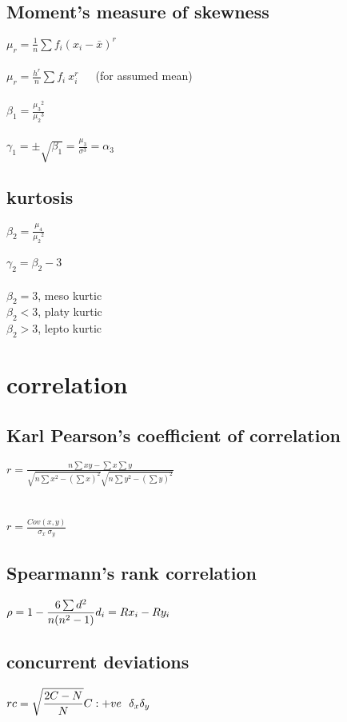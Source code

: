\documentclass[12pt]{article}
\begin{document}
\subsection{Moment's measure of skewness}
$\displaystyle \mu_r = \frac{1}{n} \sum{f_i(x_i -  \bar{x})^r}$ \\ \\
$\displaystyle \mu_r = \frac{h^r}{n} \sum{f_i\ x_i^r}$\ \ \ (for assumed mean) \\ \\
$\displaystyle \beta_1 = \frac{{\mu_3}^2}{{\mu_2}^3}$ \\ \\
$\displaystyle \gamma_1 = \pm \sqrt{\beta_1} = \frac{\mu_3}{\sigma^3} = \alpha_3$
\newpage

\subsection{kurtosis}
$\displaystyle \beta_2 = \frac{\mu_4}{{\mu_2}^2}$ \\ \\
$\displaystyle \gamma_2 = \beta_2 - 3$ \\ \\
$\beta_2 = 3$, meso kurtic \\
$\beta_2 < 3$, platy kurtic \\
$\beta_2 > 3$, lepto kurtic

\section{correlation}
\subsection{Karl Pearson's coefficient of correlation}
$\displaystyle r = \frac{ n \sum{xy} - \sum{x}\sum{y} }{
\sqrt{n\sum{x^2} - {(\sum{x})}^2 } \sqrt{n\sum{y^2} - {(\sum{y})}^2 } }$ \\ \\ \\
$\displaystyle r = \frac{Cov(x, y)}{\sigma_x\ \sigma_y}$

\subsection{Spearmann's rank correlation}
$\displaystyle \rho = 1 - \frac{6\sum{d^2}}{n(n^2 - 1)} \\ \\
d_i = Rx_i - Ry_i $
\subsection{concurrent deviations}
$\displaystyle rc = \sqrt{\frac{2C-N}{N}} \\ \\
C: +ve\ \ \delta_x \delta_y$

\end{document}

